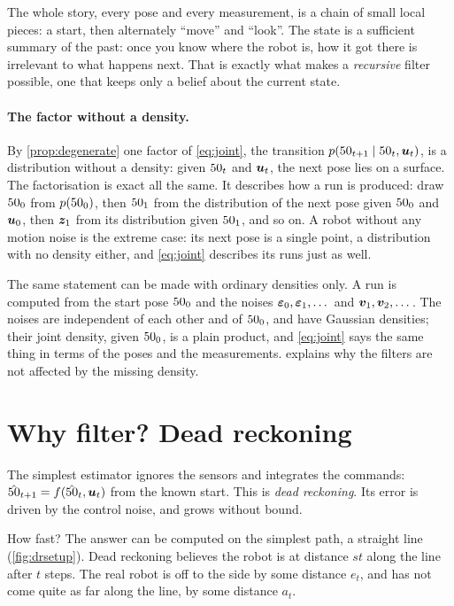 \begin{inwords}
The whole story, every pose and every measurement, is a chain of small
local pieces: a start, then alternately ``move'' and ``look''. The state
is a sufficient summary of the past: once you know where the robot is,
how it got there is irrelevant to what happens next. That is exactly what
makes a \emph{recursive} filter possible, one that keeps only a belief
about the current state.
\end{inwords}

\paragraph{The factor without a density.} By \cref{prop:degenerate} one
factor of \eqref{eq:joint}, the transition
$p(50_{t+1}\mid50_t,\bm{u}_t)$, is a distribution without a density: given
$50_t$ and $\bm{u}_t$, the next pose lies on a surface. The factorisation is
exact all the same. It describes how a run is produced: draw $50_0$ from
$p(50_0)$, then $50_1$ from the distribution of the next pose given $50_0$
and $\bm{u}_0$, then $\bm{z}_1$ from its distribution given $50_1$, and so on. A
robot without any motion noise is the extreme case: its next pose is a
single point, a distribution with no density either, and \eqref{eq:joint}
describes its runs just as well.

The same statement can be made with ordinary densities only. A run is
computed from the start pose $50_0$ and the noises
$\bm{\varepsilon}_0,\bm{\varepsilon}_1,\dots$ and $\bm{v}_1,\bm{v}_2,\dots$. The noises are
independent of each other and of $50_0$, and have Gaussian densities;
their joint density, given $50_0$, is a plain product, and \eqref{eq:joint} says the same thing in terms of the poses
and the measurements.  explains why the filters are not
affected by the missing density.

\section{Why filter? Dead reckoning}
\label{sec:deadreckoning}

The simplest estimator ignores the sensors and integrates the commands:
$\hat{50}_{t+1}=f(\hat{50}_t,\bm{u}_t)$ from the known start. This is \emph{dead
reckoning}. Its error is driven by the control noise, and grows without
bound.

How fast? The answer can be computed on the simplest path, a straight
line (\cref{fig:drsetup}). Dead reckoning believes the robot is at
distance $st$ along the line after $t$ steps. The real robot is off to the
side by some distance $e_t$, and has not come quite as far along the line,
by some distance $a_t$.

